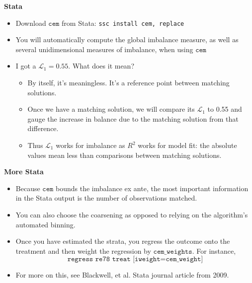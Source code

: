 \documentclass[notes=show]{beamer}
\begin{document}
\begin{frame}[plain]
	\begin{center}
	\textbf{Stata}
	\end{center}
	
	\begin{itemize}
	\item Download $\texttt{cem}$ from Stata:  \texttt{ssc install cem, replace}
	\item You will automatically compute the global imbalance measure, as well as several unidimensional measures of imbalance, when using $\texttt{cem}$
	\item I got a $\mathcal{L}_1=0.55$.  What does it mean?
		\begin{itemize}
		\item By itself, it's meaningless.  It's a reference point between matching solutions.
		\item Once we have a matching solution, we will compare its $\mathcal{L}_1$ to 0.55 and gauge the increase in balance due to the matching solution from that difference.
		\item Thus $\mathcal{L}_1$ works for imbalance as $R^2$ works for model fit: the absolute values mean less than comparisons between matching solutions.
		\end{itemize}
	\end{itemize}
	
\end{frame}

\begin{frame}[plain]
	\begin{center}
	\textbf{More Stata}
	\end{center}
	
	\begin{itemize}
	\item Because $\texttt{cem}$ bounds the imbalance ex ante, the most important information in the Stata output is the number of observations matched.
	\item You can also choose the coarsening as opposed to relying on the algorithm's automated binning.  
	\item Once you have estimated the strata, you regress the outcome onto the treatment and then weight the regression by $\texttt{cem_weights}$.  For instance, $$\texttt{regress re78 treat [iweight=cem\_weight]}$$
	\item For more on this, see Blackwell, et al. Stata journal article from 2009.  
	\end{itemize}
\end{frame}
\end{document}

